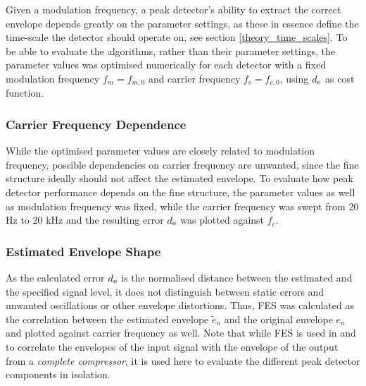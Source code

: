\documentclass[../main2.tex]{subfiles}
\begin{document}
Given a modulation frequency, a peak detector's ability to extract the correct envelope depends greatly on the parameter settings, as these in essence define the time-scale the detector should operate on, see section \ref{theory_time_scales}. To be able to evaluate the algorithms, rather than their parameter settings, the parameter values was optimised numerically for each detector with a fixed modulation frequency $f_m = f_{m,0}$ and carrier frequency $f_c = f_{c,0}$, using $d_\text{e}$ as cost function.

\subsubsection{Carrier Frequency Dependence}
While the optimised parameter values are closely related to modulation frequency, possible dependencies on carrier frequency are unwanted, since the fine structure ideally should not affect the estimated envelope. To evaluate how peak detector performance depends on the fine structure, the parameter values as well as modulation frequency was fixed, while the carrier frequency was swept from 20 Hz to 20 kHz and the resulting error $d_\text{e}$ was plotted against $f_c$.

\subsubsection{Estimated Envelope Shape}
As the calculated error $d_\text{e}$ is the normalised distance between the estimated and the specified signal level, it does not distinguish between static errors and unwanted oscillations or other envelope distortions. Thus, FES was calculated as the correlation between the estimated envelope $\tilde{e}_n$ and the original envelope $e_n$ and plotted against carrier frequency as well. Note that while FES is used in \cite{stone1992syllabic}\cite{stone2007quantifying} and \cite{reiss2012tutorial} to correlate the envelopes of the input signal with the envelope of the output from a \emph{complete compressor}, it is used here to evaluate the different peak detector components in isolation. 
\end{document}
